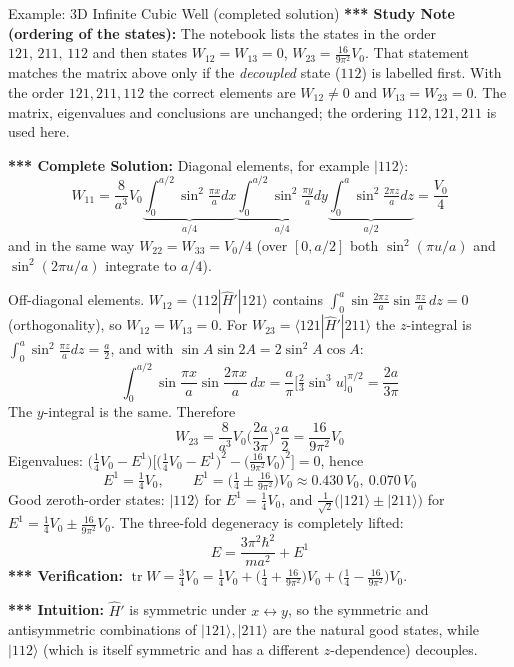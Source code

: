 \documentclass[11pt,a4paper]{article}
\begin{document}
\begin{prob}{Example: 3D Infinite Cubic Well (completed solution)}
\textbf{*** Study Note (ordering of the states):} The notebook lists the states in the order $121,\,211,\,112$ and then states $W_{12}=W_{13}=0$, $W_{23}=\frac{16}{9\pi^2}V_0$. That statement matches the matrix above only if the \textit{decoupled} state ($112$) is labelled first. With the order $121,211,112$ the correct elements are $W_{12}\neq 0$ and $W_{13}=W_{23}=0$. The matrix, eigenvalues and conclusions are unchanged; the ordering $112,121,211$ is used here.

\textbf{*** Complete Solution:} Diagonal elements, for example $|112\rangle$:
\[
W_{11} = \frac{8}{a^3}V_0\underbrace{\int_0^{a/2}\!\sin^2\tfrac{\pi x}{a}dx}_{a/4}\underbrace{\int_0^{a/2}\!\sin^2\tfrac{\pi y}{a}dy}_{a/4}\underbrace{\int_0^{a}\!\sin^2\tfrac{2\pi z}{a}dz}_{a/2} = \frac{V_0}{4}
\]
and in the same way $W_{22}=W_{33}=V_0/4$ (over $[0,a/2]$ both $\sin^2(\pi u/a)$ and $\sin^2(2\pi u/a)$ integrate to $a/4$).

Off-diagonal elements. $W_{12}=\langle 112|\hat H'|121\rangle$ contains $\int_0^a\sin\frac{2\pi z}{a}\sin\frac{\pi z}{a}\,dz=0$ (orthogonality), so $W_{12}=W_{13}=0$. For $W_{23}=\langle121|\hat H'|211\rangle$ the $z$-integral is $\int_0^a\sin^2\frac{\pi z}{a}dz = \frac a2$, and with $\sin A\sin 2A = 2\sin^2A\cos A$:
\[
\int_0^{a/2}\sin\frac{\pi x}{a}\sin\frac{2\pi x}{a}\,dx = \frac a\pi\Big[\tfrac23\sin^3u\Big]_0^{\pi/2} = \frac{2a}{3\pi}
\]
The $y$-integral is the same. Therefore
\[
W_{23} = \frac{8}{a^3}V_0\Big(\frac{2a}{3\pi}\Big)^2\frac a2 = \frac{16}{9\pi^2}V_0
\]
Eigenvalues: $\big(\tfrac14V_0-E^1\big)\Big[\big(\tfrac14V_0-E^1\big)^2 - \big(\tfrac{16}{9\pi^2}V_0\big)^2\Big]=0$, hence
\[
E^1 = \tfrac14V_0, \qquad E^1 = \Big(\tfrac14 \pm \tfrac{16}{9\pi^2}\Big)V_0 \approx 0.430\,V_0,\ 0.070\,V_0
\]
Good zeroth-order states: $|112\rangle$ for $E^1=\frac14V_0$, and $\frac1{\sqrt2}\big(|121\rangle \pm |211\rangle\big)$ for $E^1 = \frac14V_0 \pm \frac{16}{9\pi^2}V_0$. The three-fold degeneracy is completely lifted:
\[
E = \frac{3\pi^2\hbar^2}{ma^2} + E^1
\]
\textbf{*** Verification:} $\operatorname{tr}W = \frac34V_0 = \frac14V_0 + \big(\frac14+\frac{16}{9\pi^2}\big)V_0 + \big(\frac14-\frac{16}{9\pi^2}\big)V_0$. \checkmark

\textbf{*** Intuition:} $\hat H'$ is symmetric under $x\leftrightarrow y$, so the symmetric and antisymmetric combinations of $|121\rangle,|211\rangle$ are the natural good states, while $|112\rangle$ (which is itself symmetric and has a different $z$-dependence) decouples.
\end{prob}
\end{document}

